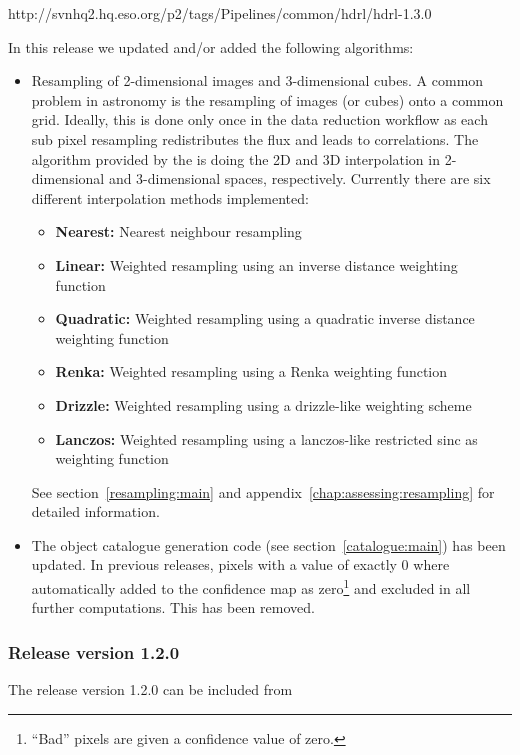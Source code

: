 http://svnhq2.hq.eso.org/p2/tags/Pipelines/common/hdrl/hdrl-1.3.0

In this release we updated and/or added the following algorithms:
\begin{itemize}
\item Resampling of 2-dimensional images and 3-dimensional cubes. A common
  problem in astronomy is the resampling of images (or cubes) onto a common
  grid. Ideally, this is done only once in the data reduction workflow as each
  sub pixel resampling redistributes the flux and leads to correlations. The
  algorithm provided by the \HDRL is doing the 2D and 3D interpolation in
  2-dimensional and 3-dimensional spaces, respectively. Currently there are six
  different interpolation methods implemented:
\begin{center}
\begin{itemize}
\item {\bf Nearest:} Nearest neighbour resampling
\item {\bf Linear:} Weighted resampling using an inverse distance weighting
  function
\item {\bf Quadratic:} Weighted resampling using a quadratic inverse distance
  weighting function
\item {\bf Renka:} Weighted resampling using a Renka weighting function
\item {\bf Drizzle:} Weighted resampling using a drizzle-like weighting scheme
\item {\bf Lanczos:} Weighted resampling using a lanczos-like restricted sinc as
  weighting function
\end{itemize}
\end{center}
  See section~\ref{resampling:main} and appendix~\ref{chap:assessing:resampling}
  for detailed information.
\item The object catalogue generation code (see section~\ref{catalogue:main})
  has been updated. In previous releases, pixels with a value of exactly 0 where
  automatically added to the confidence map as zero\footnote{``Bad'' pixels are
  given a confidence value of zero.} and excluded in all further
  computations. This has been removed.
\end{itemize}

\subsubsection{Release version 1.2.0}
The \HDRL release version 1.2.0 can be included from\\

